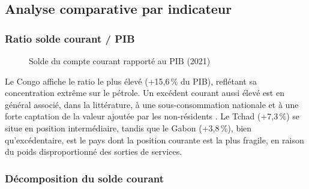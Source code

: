 \documentclass[12pt,a4paper]{article}
\begin{document}
\subsection{Analyse comparative par indicateur}

\subsubsection{Ratio solde courant / PIB}

\begin{figure}[h!]
  \centering
  \caption{Solde du compte courant rapporté au PIB (2021)}
  \label{fig:solde_pib}
\end{figure}

Le Congo affiche le ratio le plus élevé (+15,6\,\% du PIB), reflétant sa concentration
extrême sur le pétrole. Un excédent courant aussi élevé est en général associé, dans la
littérature, à une sous-consommation nationale et à une forte captation de la valeur ajoutée
par les non-résidents \parencite{krugmanobstfeld2018}. Le Tchad (+7,3\,\%) se situe en
position intermédiaire, tandis que le Gabon (+3,8\,\%), bien qu'excédentaire, est le pays
dont la position courante est la plus fragile, en raison du poids disproportionné des
sorties de services.

\subsubsection{Décomposition du solde courant}
\end{document}
